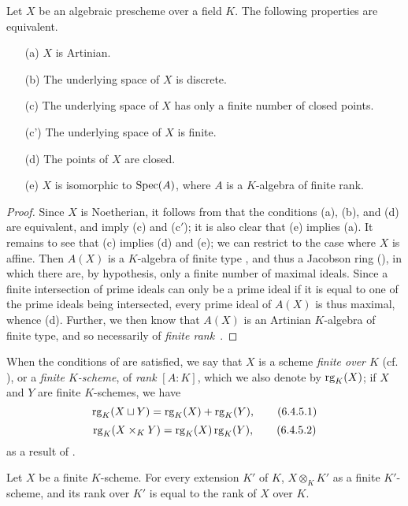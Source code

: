 \begin{proposition}[6.4.4]
\label{I.6.4.4}
Let $X$ be an algebraic prescheme over a field $K$.
The following properties are equivalent.
\begin{enumerate}
  \item[{\rm(a)}] $X$ is Artinian.
  \item[{\rm(b)}] The underlying space of $X$ is discrete.
  \item[{\rm(c)}] The underlying space of $X$ has only a finite number of closed points.
  \item[{\rm(c')}] The underlying space of $X$ is finite.
  \item[{\rm(d)}] The points of $X$ are closed.
  \item[{\rm(e)}] $X$ is isomorphic to $\operatorname{Spec}(A)$, where $A$ is a $K$-algebra of finite rank.
\end{enumerate}
\end{proposition}

\begin{proof}
\label{proof-I.6.4.4}
Since $X$ is Noetherian, it follows from  that the conditions (a), (b), and (d) are equivalent, and imply (c) and (c$'$);
it is also clear that (e) implies (a).
It remains to see that (c) implies (d) and (e);
we can restrict to the case where $X$ is affine.
Then $A(X)$ is a $K$-algebra of finite type , and thus a Jacobson ring (\cite[p.~3-11 and 3-12]{I-1}), in which there are, by hypothesis, only a finite number of maximal ideals.
Since a finite intersection of prime ideals can only be a prime ideal if it is equal to one of the prime ideals being intersected, every prime ideal of $A(X)$ is thus maximal, whence (d).
Further, we then know  that $A(X)$ is an Artinian $K$-algebra of finite type, and so necessarily of \emph{finite rank}~\cite{I-21}.
\end{proof}

\begin{env}[6.4.5]
\label{I.6.4.5}
When the conditions of  are satisfied, we say that $X$ is a scheme \emph{finite over $K$} (cf. ), or a \emph{finite $K$-scheme}, of \emph{rank} $[A:K]$, which we also denote by $\operatorname{rg}_K(X)$;
if $X$ and $Y$ are finite $K$-schemes, we have
\[
  \operatorname{rg}_K(X\sqcup Y)=\operatorname{rg}_K(X)+\operatorname{rg}_K(Y),
  \tag{6.4.5.1}
\]
\[
  \operatorname{rg}_K(X\times_K Y)=\operatorname{rg}_K(X)\operatorname{rg}_K(Y),
  \tag{6.4.5.2}
\]
as a result of .
\end{env}

\begin{corollary}[6.4.6]
\label{I.6.4.6}
Let $X$ be a finite $K$-scheme.
For every extension $K'$ of $K$, $X\otimes_K K'$ as a finite $K'$-scheme, and its rank over $K'$ is equal to the rank of $X$ over $K$.
\end{corollary}

